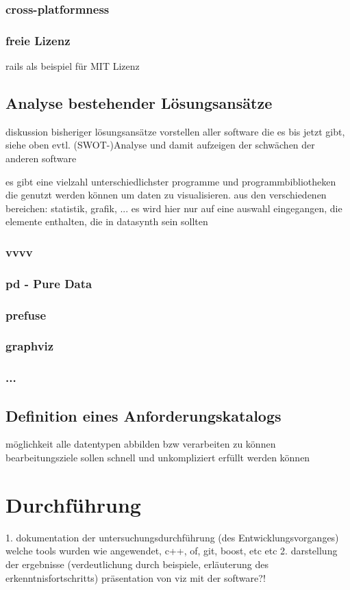 \documentclass[a4paper, 12pt, onepage, pdftex, headsepline, footsepline]{scrreprt}
\begin{document}
\subsection{cross-platformness}
\subsection{freie Lizenz}
rails als beispiel für MIT Lizenz

\section{Analyse bestehender Lösungsansätze}
diskussion bisheriger lösungsansätze
vorstellen aller software die es bis jetzt gibt, siehe oben
evtl. (SWOT-)Analyse und damit aufzeigen der schwächen der anderen software

es gibt eine vielzahl unterschiedlichster programme und programmbibliotheken die genutzt werden können um daten zu visualisieren.
aus den verschiedenen bereichen: statistik, grafik, ...
es wird hier nur auf eine auswahl eingegangen, die elemente enthalten, die in datasynth sein sollten
\subsection{vvvv}
\subsection{pd - Pure Data}
\subsection{prefuse}
\subsection{graphviz}
\subsection{...}
\section{Definition eines Anforderungskatalogs}
möglichkeit alle datentypen abbilden bzw verarbeiten zu können
bearbeitungsziele sollen schnell und unkompliziert erfüllt werden können
\chapter{Durchführung}
1. dokumentation der untersuchungsdurchführung (des Entwicklungsvorganges)
welche tools wurden wie angewendet, c++, of, git, boost, etc etc
2. darstellung der ergebnisse (verdeutlichung durch beispiele, erläuterung des erkenntnisfortschritts)
präsentation von viz mit der software?!
\end{document}
